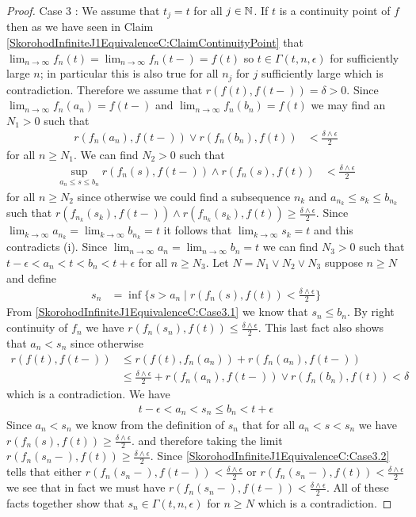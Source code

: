 \begin{proof}
Case 3 :  We assume that $t_j = t$ for all $j \in \mathbb{N}$.  If $t$ is a continuity point of $f$ then as we have seen in Claim \ref{SkorohodInfiniteJ1EquivalenceC:ClaimContinuityPoint} that $\lim_{n \to \infty} f_n(t) = \lim_{n \to \infty} f_n(t-) = f(t)$ so $t \in \Gamma(t, n, \epsilon)$ for sufficiently large $n$; in particular this is also true for all $n_j$ for $j$ sufficiently large which is contradiction.  Therefore we assume that $r(f(t), f(t-)) = \delta > 0$.  Since $\lim_{n \to \infty} f_n(a_n) = f(t-)$ and $\lim_{n \to \infty} f_n(b_n) = f(t)$ we may find an $N_1 > 0$ such that 
\begin{align}\label{SkorohodInfiniteJ1EquivalenceC:Case3.1}
r(f_n(a_n), f(t-)) \vee r(f_n(b_n), f(t)) &< \frac{\delta \wedge \epsilon}{2}
\end{align}
for all $n \geq N_1$.
We can find $N_2 > 0$ such that
\begin{align}\label{SkorohodInfiniteJ1EquivalenceC:Case3.2}
\sup_{a_n \leq s \leq b_n} r(f_n(s), f(t-)) \wedge r(f_n(s), f(t)) &< \frac{\delta \wedge \epsilon}{2}
\end{align}
for all $n \geq N_2$ since otherwise we could find a subsequence $n_k$ and $a_{n_k} \leq s_k \leq b_{n_k}$ such that $r(f_{n_k}(s_k), f(t-)) \wedge r(f_{n_k}(s_k), f(t)) \geq \frac{\delta \wedge \epsilon}{2}$.  Since $\lim_{k \to \infty} a_{n_k}  = \lim_{k \to \infty} b_{n_k} = t$ it follows that $\lim_{k \to \infty} s_k = t$ and this contradicts (i).
Since $\lim_{n \to \infty} a_n = \lim_{n \to \infty} b_n = t$ we can find $N_3>0$ such that $t - \epsilon < a_n < t < b_n < t + \epsilon$ for all $n \geq N_3$.  Let $N = N_1 \vee N_2 \vee N_3$ suppose $n \geq N$ and define
\begin{align*}
s_n &= \inf \lbrace s > a_n \mid r(f_n(s), f(t)) < \frac{\delta \wedge \epsilon}{2} \rbrace
\end{align*}
From \eqref{SkorohodInfiniteJ1EquivalenceC:Case3.1} we know that $s_n \leq b_n$.  By right continuity of $f_n$ we have $r(f_n(s_n), f(t)) \leq \frac{\delta \wedge \epsilon}{2}$.  This last fact also shows that $a_n < s_n$ since otherwise 
\begin{align*}
r(f(t), f(t-)) &\leq r(f(t), f_n(a_n)) + r(f_n(a_n), f(t-)) \\
&\leq \frac{\delta \wedge \epsilon}{2} + r(f_n(a_n), f(t-)) \vee r(f_n(b_n), f(t)) < \delta
\end{align*}
which is a contradiction.  We have 
\begin{align*}
t - \epsilon < a_n < s_n  \leq b_n < t + \epsilon
\end{align*} 
Since $a_n < s_n$ we know from the definition of $s_n$ that for all $a_n < s < s_n$ we have $r(f_n(s), f(t)) \geq \frac{\delta \wedge \epsilon}{2}$. and therefore taking the limit $r(f_n(s_n-), f(t)) \geq \frac{\delta \wedge \epsilon}{2}$.  Since \eqref{SkorohodInfiniteJ1EquivalenceC:Case3.2} tells that either $r(f_n(s_n-), f(t-)) < \frac{\delta \wedge \epsilon}{2}$  or $r(f_n(s_n-), f(t)) < \frac{\delta \wedge \epsilon}{2}$ we see that in fact we must have $r(f_n(s_n-), f(t-)) < \frac{\delta \wedge \epsilon}{2}$.  All of these facts together show that $s_n \in \Gamma(t, n, \epsilon)$ for $n \geq N$ which is a contradiction.


\end{proof}
